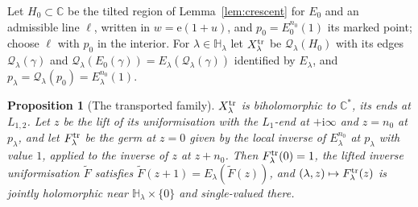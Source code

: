 \documentclass[11pt]{amsart}
\newtheorem{proposition}[theorem]{Proposition}
\theoremstyle{definition}
\newcommand{\eee}{\mathrm{e}}
\newcommand{\ii}{\mathrm{i}}
\begin{document}
Let $H_0\subset\mathbb C$ be the tilted region of Lemma~\ref{lem:crescent} for $E_0$
and an admissible line $\ell$, written in $w=\eee(1+u)$, and $p_0=E_0^{n_0}(1)$ its
marked point; choose $\ell$ with $p_0$ in the interior.  For $\lambda\in\mathbb H_\lambda$ let
$X^{\rm tr}_\lambda$ be $\mathcal Q_\lambda(H_0)$ with its edges $\mathcal Q_\lambda(\gamma)$ and
$\mathcal Q_\lambda(E_0(\gamma))=E_\lambda(\mathcal Q_\lambda(\gamma))$ identified by $E_\lambda$, and $p_\lambda=\mathcal Q_\lambda(p_0)=E_\lambda^{n_0}(1)$.

\begin{proposition}[The transported family]\label{prop:global-family}
$X^{\rm tr}_\lambda$ is biholomorphic to $\mathbb C^*$, its ends at $L_{1,2}$.  Let $z$ be
the lift of its uniformisation with the $L_1$-end at $+\ii\infty$ and $z=n_0$ at
$p_\lambda$, and let $F^{\rm tr}_\lambda$ be the germ at $z=0$ given by the local inverse of
$E_\lambda^{n_0}$ at $p_\lambda$ with value $1$, applied to the inverse of $z$ at $z+n_0$.  Then
$F^{\rm tr}_\lambda(0)=1$, the lifted inverse uniformisation $\tilde F$ satisfies
$\tilde F(z+1)=E_\lambda(\tilde F(z))$, and $(\lambda,z)\mapsto F^{\rm tr}_\lambda(z)$ is jointly holomorphic near
$\mathbb H_\lambda\times\{0\}$ and single-valued there.
\end{proposition}
\end{document}
